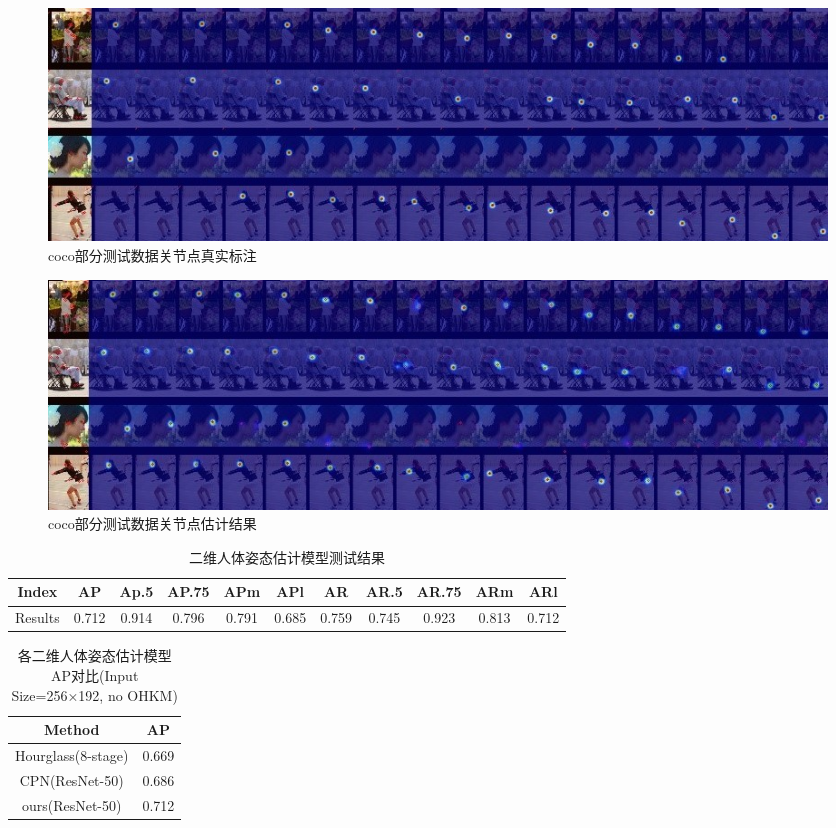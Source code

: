 \begin{figure}[h]
	\centering
	\includegraphics[scale=0.4]{figures/21.jpg}
	\caption{coco部分测试数据关节点真实标注}
	\label{fig:f21}
\end{figure}

\begin{figure}[h]
	\centering
	\includegraphics[scale=0.4]{figures/22.jpg}
	\caption{coco部分测试数据关节点估计结果}
	\label{fig:f22}
\end{figure}

\begin{table}[h]
    \caption{\label{tab:t1}二维人体姿态估计模型测试结果}
    \centering
    \begin{tabular}{c c c c c c c c c c c}
        \toprule
        Index	   & AP	    & Ap.5	    & AP.75	    & APm	    & APl	    & AR	    & AR.5	    & AR.75	    & ARm	    & ARl   \\
        \midrule
        Results   & 0.712	& 0.914	    & 0.796     & 0.791	    & 0.685	    & 0.759	    & 0.745	    & 0.923	    & 0.813	    & 0.712   \\
        \bottomrule
    \end{tabular}
\end{table}

\begin{table}[h]
    \caption{\label{tab:t2}各二维人体姿态估计模型AP对比(Input Size=256×192, no OHKM)}
    \centering
    \begin{tabular}{c c}
        \toprule
        Method	   & AP	 \\
        \midrule
        Hourglass(8-stage)	& 0.669 \\
        CPN(ResNet-50)	    & 0.686 \\
        ours(ResNet-50)	    & 0.712 \\
        \bottomrule
    \end{tabular}
\end{table}